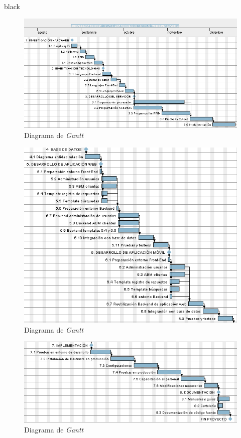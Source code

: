 \documentclass[11pt]{charter}
\begin{document}
\begin{consigna}{black}
\begin{figure}[htpb]
\centering 
\includegraphics[width=.9\textwidth]{./Figuras/Gantt-3-1.png}
\caption{Diagrama de \textit{Gantt}}
\label{fig:AoN}
\end{figure}
\begin{figure}[htpb]
\centering 
\includegraphics[width=.9\textwidth]{./Figuras/Gantt-3-2.png}
\caption{Diagrama de \textit{Gantt}}
\label{fig:AoN}
\end{figure}
\begin{figure}[htpb]
\centering 
\includegraphics[width=.9\textwidth]{./Figuras/Gantt-3-3.png}
\caption{Diagrama de \textit{Gantt}}
\label{fig:AoN}
\end{figure}



\end{consigna}
\end{document}
